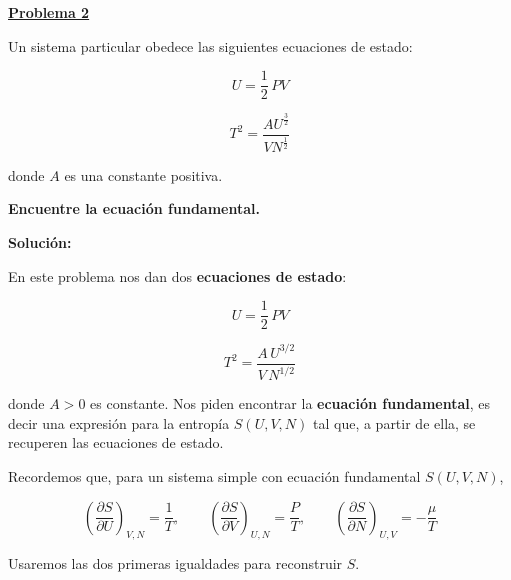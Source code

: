 \documentclass{article}
\newenvironment{AGbox}[1][7]%
{%
  \begin{tcolorbox}[
    enhanced, breakable,
    colframe=AppleGreen,
    colback=AppleGreen!#1,
    boxrule=1pt,
    borderline west={2mm}{-10mm}{AppleGreen},
    sharp corners=southwest,
    left=14pt,right=14pt,top=10pt,bottom=10pt,
     boxsep=6pt,
  ]%
}{%
  \end{tcolorbox}%
}
\begin{document}
\begin{AGbox}[8]
\textcolor{Apple Green}{\textbf{\underline{Problema 2}}} \vspace{2mm}

Un sistema particular obedece las siguientes ecuaciones de estado:

\begin{equation}
U = \frac{1}{2}\,PV
\label{eq:P2_U}
\end{equation}

\begin{equation}
T^{2} = \frac{A U^{\frac{3}{2}} }{VN^{\frac{1}{2}}}
\label{eq:P2_T}
\end{equation}

donde \(A\) es una constante positiva.  

\textbf{Encuentre la ecuación fundamental.}

\end{AGbox}
\vspace{0.5cm}

\textcolor{Tuscany}{\textbf{Solución:}}

En este problema nos dan dos \textcolor{Tarawera}{\textbf{ecuaciones de estado}}:

\begin{equation}
U = \frac{1}{2}\,P V
\label{eq:solP2_U}
\end{equation}

\begin{equation}
T^{2} = \frac{A\,U^{3/2}}{V\,N^{1/2}}
\label{eq:solP2_T2}
\end{equation}

donde \(A>0\) es constante.  
Nos piden encontrar la \textcolor{Cinnabar}{\textbf{ecuación fundamental}}, es decir una expresión
para la entropía \(S(U,V,N)\) tal que, a partir de ella, se recuperen las ecuaciones de estado.

Recordemos que, para un sistema simple con ecuación fundamental \(S(U,V,N)\),

\begin{equation}
\left(\frac{\partial S}{\partial U}\right)_{V,N} = \frac{1}{T},
\qquad
\left(\frac{\partial S}{\partial V}\right)_{U,N} = \frac{P}{T},
\qquad
\left(\frac{\partial S}{\partial N}\right)_{U,V} = -\frac{\mu}{T}
\label{eq:solP2_dS_id}
\end{equation}

Usaremos las dos primeras igualdades para reconstruir \(S\).
\end{document}
